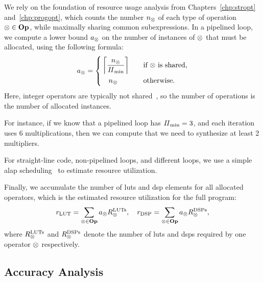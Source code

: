 We rely on the foundation of resource usage analysis from
Chapters~\ref{chp:stropt} and~\ref{chp:progopt}, which counts the number
$n_\otimes$ of each type of operation $\otimes \in \mathbf{Op}$, while maximally
sharing common subexpressions.  In a pipelined loop, we compute a lower bound
$a_\otimes$ on the number of instances of $\otimes$ that must be allocated,
using the following formula:
\begin{equation}
    a_\otimes = \left\{
        \begin{aligned}
            & \left\lceil \frac{n_\otimes}{\mathit{II}_{\rm min}} \right\rceil
            && \quad \text{if $\otimes$ is shared}, \\
            & \quad n_\otimes
            && \quad \text{otherwise}.
        \end{aligned}
    \right.
\end{equation}
Here, integer operators are typically not shared~\cite{cong15}, so the number
of operations is the number of allocated instances.

For instance, if we know that a pipelined loop has $\mathit{II}_{\rm min} = 3$, and each
iteration uses 6 multiplications, then we can compute that we need to
synthesize at least 2 multipliers.

For straight-line code, non-pipelined loops, and different loops, we use a
simple \gls{alap} scheduling~\cite{wang_hls} to estimate resource utilization.

Finally, we accumulate the number of \glspl{lut} and \gls{dsp} elements for all
allocated operators, which is the estimated resource utilization for the full
program:
\begin{equation}
    r_\mathrm{LUT} =
        \sum_{\otimes \in \mathbf{Op}} a_\otimes R^\mathrm{LUTs}_\otimes, \quad
    r_\mathrm{DSP} =
        \sum_{\otimes \in \mathbf{Op}} a_\otimes R^\mathrm{DSPs}_\otimes,
\end{equation}
where $R^\mathrm{LUTs}_\otimes$ and $R^\mathrm{DSPs}_\otimes$ denote the
number of \glspl{lut} and \glspl{dsp} required by one operator $\otimes$
respectively.


\subsection{Accuracy Analysis}
\label{lo:sub:accuracy}

